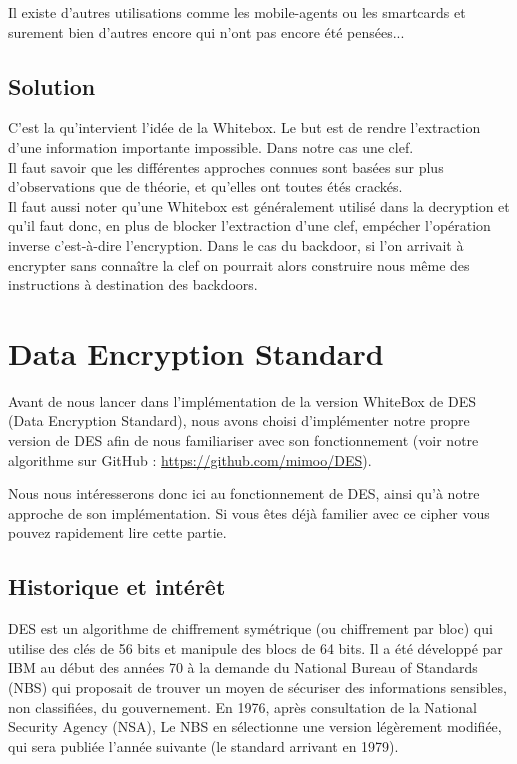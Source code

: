 \documentclass[a4paper,12pt]{article}
\begin{document}
Il existe d'autres utilisations comme les mobile-agents ou les smartcards et surement bien d'autres encore qui n'ont pas encore été pensées...


\subsection{Solution}

C'est la qu'intervient l'idée de la Whitebox. Le but est de rendre l'extraction d'une information importante impossible. Dans notre cas une clef.\\
Il faut savoir que les différentes approches connues sont basées sur plus d'observations que de théorie, et qu'elles ont toutes étés crackés.\\
Il faut aussi noter qu'une Whitebox est généralement utilisé dans la decryption et qu'il faut donc, en plus de blocker l'extraction d'une clef, empécher l'opération inverse c'est-à-dire l'encryption. Dans le cas du backdoor, si l'on arrivait à encrypter sans connaître la clef on pourrait alors construire nous même des instructions à destination des backdoors.\\

\newpage
	
\section{Data Encryption Standard}

Avant de nous lancer dans l'implémentation de la version WhiteBox de DES (Data Encryption Standard), nous avons choisi d'implémenter notre propre version de DES afin de nous familiariser avec son fonctionnement (voir notre algorithme sur GitHub : \url{https://github.com/mimoo/DES}).
	
Nous nous intéresserons donc ici au fonctionnement de DES, ainsi qu'à notre approche de son implémentation. Si vous êtes déjà familier avec ce cipher vous pouvez rapidement lire cette partie.

\subsection{Historique et intérêt}

DES est un algorithme de chiffrement symétrique (ou chiffrement par bloc) qui utilise des clés de 56 bits et manipule des blocs de 64 bits. Il a été développé par IBM au début des années 70 à la demande du National Bureau of Standards (NBS) qui proposait de trouver un moyen de sécuriser des informations sensibles, non classifiées, du gouvernement. En 1976, après consultation de la National Security Agency (NSA), Le NBS en sélectionne une version légèrement modifiée, qui sera publiée l'année suivante (le standard arrivant en 1979).
\end{document}

